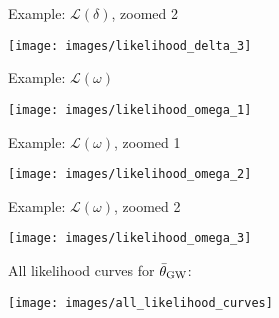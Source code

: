 \documentclass[10pt]{beamer}
\begin{document}
\begin{frame}{}
	
	Example: $\mathcal{L}(\delta)$, zoomed 2
	
	\texttt{[image: images/likelihood\_delta\_3]}
	
	
\end{frame}


\begin{frame}{}
	
	Example: $\mathcal{L}(\omega)$
	
	\texttt{[image: images/likelihood\_omega\_1]}

	
\end{frame}


\begin{frame}{}
	
	Example: $\mathcal{L}(\omega)$, zoomed 1
	
	\texttt{[image: images/likelihood\_omega\_2]}
	
	
\end{frame}


\begin{frame}{}
	
	Example: $\mathcal{L}(\omega)$, zoomed 2
	
	\texttt{[image: images/likelihood\_omega\_3]}
	
	
\end{frame}


\begin{frame}{}
	
	All likelihood curves for $\bar{\theta}_{\rm GW}$:
	
	\texttt{[image: images/all\_likelihood\_curves]}
	
	
\end{frame}
\end{document}
